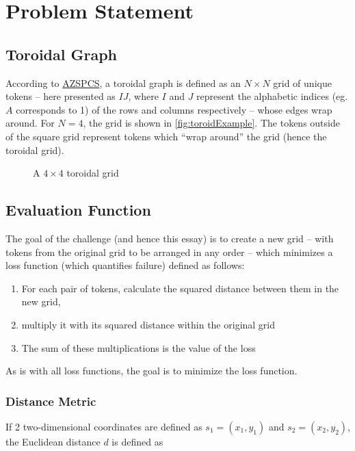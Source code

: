 
\section{Problem Statement}%
\label{sec:problem_statement}

\subsection{Toroidal Graph}%
\label{sub:toroidal_graph}


According to \href{http://azspcs.com/Contest/Nearness}{AZSPCS}, a toroidal graph is defined as an $N\times N$ grid of unique tokens -- here presented as $IJ$, where $I$ and $J$ represent the alphabetic indices (eg. $A$ corresponds to 1) of the rows and columns respectively -- whose edges wrap around. For $N=4$, the grid is shown in \autoref{fig:toroidExample}. The tokens outside of the square grid represent tokens which ``wrap around'' the grid (hence the toroidal grid).
\begin{figure}[htpb]
    \centering
    \caption{A $4\times 4$ toroidal grid}%
    \label{fig:toroidExample}
\end{figure}

\subsection{Evaluation Function}%
\label{sub:evaluation_function}

The goal of the challenge (and hence this essay) is to create a new grid -- with tokens from the original grid to be arranged in any order -- which minimizes a loss function (which quantifies failure) defined as follows:
\begin{enumerate}
    \item For each pair of tokens, calculate the squared distance between them in the new grid,
\item multiply it with its squared distance within the original grid
\item The sum of these multiplications is the value of the loss
\end{enumerate}
As is with all loss functions, the goal is to minimize the loss function.

\subsubsection{Distance Metric}%
\label{ssub:distance_metric}
If 2 two-dimensional coordinates are defined as $s_1=(x_1,y_1)$ and $s_2=(x_2,y_2)$, the Euclidean distance $d$ is defined as

